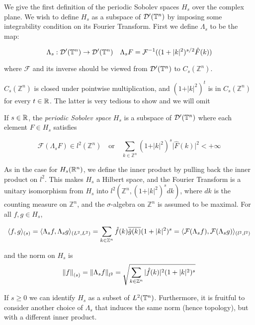 \documentclass[../main-manifolds.tex]{subfiles}
\begin{document}
We give the first definition of the periodic Sobolev spaces $H_s$ over the complex plane. We wish to define $H_s$ as a subspace of $\mathcal{D}'({\mathbb{T}^n})$ by imposing some integrability condition on its Fourier Transform. First we define $\Lambda_s$ to be the map:

$$
\Lambda_s: \mathcal{D}'({\mathbb{T}^n})\to \mathcal{D}'({\mathbb{T}^n})\quad \Lambda_s F = \mathcal{F}^{-1}((1+\vert k\vert^2)^{s/2}\hat{F}(k))
$$

where $\mathcal{F}$ and its inverse should be viewed from $\mathcal{D}'({\mathbb{T}^n})$ to $C_s(\mathbb{Z}^n)$.
\begin{remark}
$C_s(\mathbb{Z}^n)$ is closed under pointwise multiplication, and $(1+\vert k\vert^2)^{t}$ is in $C_s(\mathbb{Z}^n)$ for every $t\in\mathbb{R}$. The latter is very tedious to show and we will omit
\end{remark}

\begin{definition}
If $s\in\mathbb{R}$, the \emph{periodic Sobolev space} $H_s$ is a subspace of $\mathcal{D}'({\mathbb{T}^n})$ where each element $F\in H_s$ satisfies

$$
\mathcal{F}(\Lambda_s F)\in l^2(\mathbb{Z}^n)\quad\text{or}\quad \sum_{k\in\mathbb{Z}^n}(1+\vert k\vert^2)^s\vert\hat{F}(k)\vert^2< +\infty
$$
    
\end{definition}

As in the case for $H_s({\mathbb{R}^n})$, we define the inner product by pulling back the inner product on $l^2$. This makes $H_s$ a Hilbert space, and the Fourier Transform is a unitary isomorphism from $H_s$ into $l^2(\mathbb{Z}^n, (1+\vert k\vert^2)^{s}dk)$, where $dk$ is the counting measure on $\mathbb{Z}^n$, and the $\sigma$-algebra on $\mathbb{Z}^n$ is assumed to be maximal. For all $f,g\in H_s$,

$$
\langle f,g\rangle_{(s)} = \langle \Lambda_s f,\Lambda_s g\rangle_{(L^2,L^2)} = \sum_{k\in\mathbb{Z}^n}\hat{f}(k)\overline{\hat{g}(k)}(1+\vert k \vert^2)^{s} = \langle \mathcal{F}(\Lambda_s f),\mathcal{F}(\Lambda_s g)\rangle_{(l^2,l^2)}
$$

and the norm on $H_s$ is $$\norm{f}_{(s)} = \norm{\Lambda_s f}_{l^2} =\sqrt{\sum_{k\in\mathbb{Z}^n}\vert\hat{f}(k)\vert^2(1+\vert k \vert^2)^s}$$

If $s\geq 0$ we can identify $H_s$ as a subset of $L^2({\mathbb{T}^n})$. Furthermore, it is fruitful to consider another choice of $\Lambda_s$ that induces the same norm (hence topology), but with a different inner product.
\end{document}

